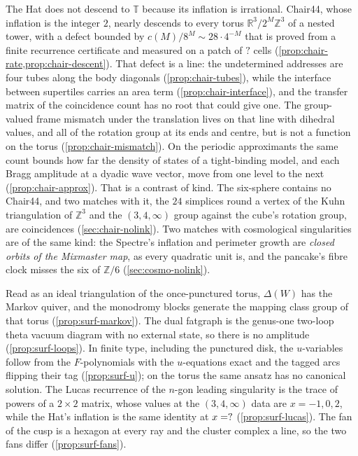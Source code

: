 \documentclass[11pt,a4paper]{article}
\newcommand{\SSChPatchCells}{?}\newcommand{\SSChRowAddr}{?}
\newcommand{\ZZ}{\mathbb{Z}}
\newcommand{\RR}{\mathbb{R}}
\newcommand{\TT}{\mathbb{T}}
\theoremstyle{plain}
\theoremstyle{definition}
\begin{document}
The Hat does not descend to $\TT$ because its inflation is irrational. Chair44, whose
inflation is the integer $2$, nearly descends to every torus $\RR^3/2^M\ZZ^3$ of a nested
tower, with a defect bounded by $c(M)/8^M\sim28\cdot4^{-M}$ that is proved from a finite
recurrence certificate and measured on a patch of $\SSChPatchCells$ cells
(\cref{prop:chair-rate,prop:chair-descent}). That defect is a line: the undetermined addresses are four tubes along
the body diagonals (\cref{prop:chair-tubes}), while the interface between supertiles carries an area term
(\cref{prop:chair-interface}), and the transfer matrix of the coincidence count has no root that could give one. The group-valued frame mismatch
under the translation lives on that line with dihedral values, and all of the rotation group at its ends and centre, but is not a function on the torus
(\cref{prop:chair-mismatch}). On the
periodic approximants the same count bounds how far the density of states of a tight-binding model, and each Bragg
amplitude at a dyadic wave vector, move from one level to the next (\cref{prop:chair-approx}). That is a contrast of kind. The six-sphere
contains no Chair44, and two matches with it, the $24$ simplices round a vertex of the
Kuhn triangulation of $\ZZ^3$ and the $(3,4,\infty)$ group against the cube's rotation
group, are coincidences (\cref{sec:chair-nolink}). Two matches with cosmological singularities are of the same kind: the
Spectre's inflation and perimeter growth are \emph{closed orbits of the Mixmaster map}, as every quadratic unit is, and the
pancake's fibre clock misses the six of $\mathbb Z/6$ (\cref{sec:cosmo-nolink}).

Read as an ideal triangulation of the once-punctured torus, $\Delta(W)$ has the Markov quiver, and the monodromy blocks generate
the mapping class group of that torus (\cref{prop:surf-markov}). The dual fatgraph is the genus-one two-loop theta vacuum diagram with no external state, so there is no amplitude
(\cref{prop:surf-loops}). In finite type, including the punctured disk, the $u$-variables follow from the $F$-polynomials with the $u$-equations exact and the tagged
arcs flipping their tag (\cref{prop:surf-u}); on the torus the same ansatz has no canonical solution. The Lucas recurrence of the $n$-gon leading singularity is the trace of powers of a $2\times2$ matrix, whose values at
the $(3,4,\infty)$ data are $x=-1,0,2$, while the Hat's inflation is the same identity at $x=?$ (\cref{prop:surf-lucas}). The fan of the cusp is a hexagon at
every ray and the cluster complex a line, so the two fans differ (\cref{prop:surf-fans}).
\end{document}
